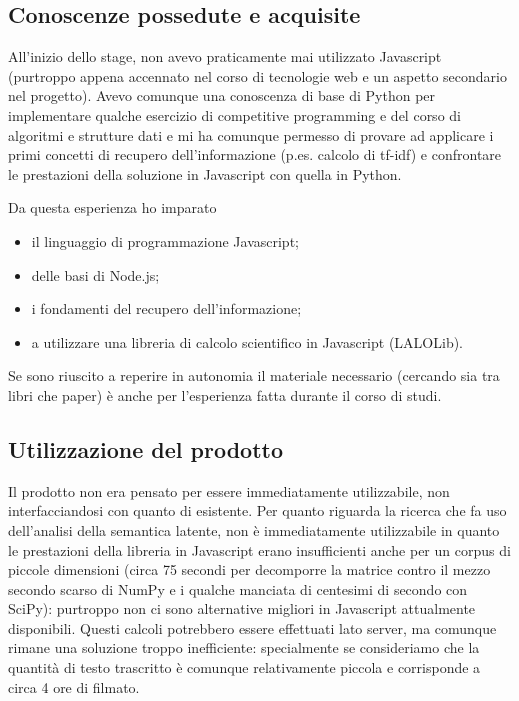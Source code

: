 \subsection{Conoscenze possedute e acquisite}
All'inizio dello stage, non avevo praticamente mai utilizzato Javascript (purtroppo appena accennato nel corso di tecnologie web e un aspetto secondario nel progetto). Avevo comunque una conoscenza di base di Python per implementare qualche esercizio di competitive programming e del corso di algoritmi e strutture dati e mi ha comunque permesso di provare ad applicare i primi concetti di recupero dell'informazione (p.es. calcolo di tf-idf) e confrontare le prestazioni della soluzione in Javascript con quella in Python.

Da questa esperienza ho imparato
\begin{itemize}
    \item il linguaggio di programmazione Javascript;
    \item delle basi di Node.js;
    \item i fondamenti del recupero dell'informazione;
    \item a utilizzare una libreria di calcolo scientifico in Javascript (LALOLib).
\end{itemize}

Se sono riuscito a reperire in autonomia il materiale necessario (cercando sia tra libri che paper) è anche per l'esperienza fatta durante il corso di studi.


\subsection{Utilizzazione del prodotto}
Il prodotto non era pensato per essere immediatamente utilizzabile, non interfacciandosi con quanto di esistente.
Per quanto riguarda la ricerca che fa uso dell'analisi della semantica latente, non è immediatamente utilizzabile in quanto le prestazioni della libreria in Javascript erano insufficienti anche per un corpus di piccole dimensioni (circa 75 secondi per decomporre la matrice contro il mezzo secondo scarso di NumPy e i qualche manciata di centesimi di secondo con SciPy): purtroppo non ci sono alternative migliori in Javascript attualmente disponibili. 
Questi calcoli potrebbero essere effettuati lato server, ma comunque rimane una soluzione troppo inefficiente: specialmente se consideriamo che la quantità di testo trascritto è comunque relativamente piccola e corrisponde a circa 4 ore di filmato.

